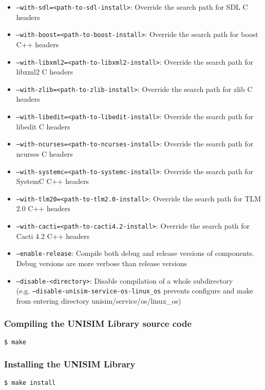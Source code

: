 \begin{itemize}
\item \texttt{--with-sdl=<path-to-sdl-install>}: Override the search path for SDL C headers
\item \texttt{--with-boost=<path-to-boost-install>}: Override the search path for boost C++ headers
\item \texttt{--with-libxml2=<path-to-libxml2-install>}: Override the search path for libxml2 C headers
\item \texttt{--with-zlib=<path-to-zlib-install>}: Override the search path for zlib C headers
\item \texttt{--with-libedit=<path-to-libedit-install>}: Override the search path for libedit C headers
\item \texttt{--with-ncurses=<path-to-ncurses-install>}: Override the search path for ncurses C headers
\item \texttt{--with-systemc=<path-to-systemc-install>}: Override the search path for SystemC C++ headers
\item \texttt{--with-tlm20=<path-to-tlm2.0-install>}: Override the search path for TLM 2.0 C++ headers
\item \texttt{--with-cacti=<path-to-cacti4.2-install>}: Override the search path for Cacti 4.2 C++ headers
\item \texttt{--enable-release}: Compile both debug and release versions of components. Debug versions are more verbose than release versions
\item \texttt{--disable-<directory>}: Disable compilation of a whole subdirectory\\ (e.g. \texttt{--disable-unisim-service-os-linux\_os} prevents configure and make from entering directory unisim/service/os/linux\_os)
\end{itemize}

\subsubsection{Compiling the UNISIM Library source code}

\begin{verbatim}
$ make
\end{verbatim}

\subsubsection{Installing the UNISIM Library}

\begin{verbatim}
$ make install
\end{verbatim}


